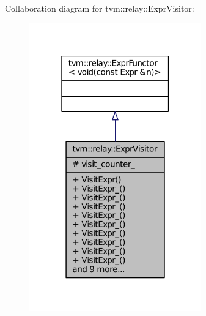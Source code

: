 Collaboration diagram for tvm\+:\+:relay\+:\+:Expr\+Visitor\+:
\nopagebreak
\begin{figure}[H]
\begin{center}
\leavevmode
\includegraphics[width=211pt]{classtvm_1_1relay_1_1ExprVisitor__coll__graph}
\end{center}
\end{figure}
